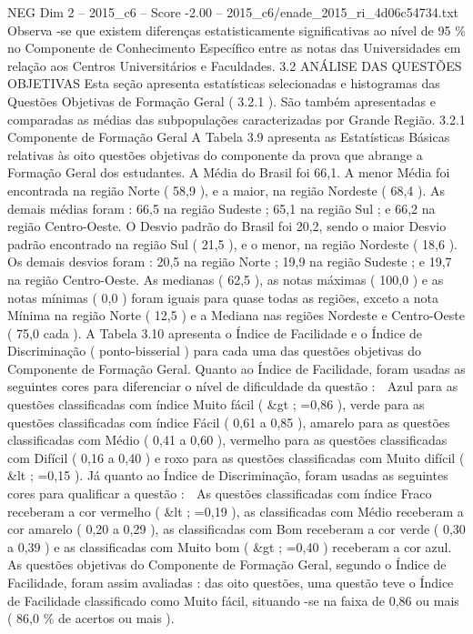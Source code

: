 \begin{textsample}{NEG Dim 2 – 2015\_c6 – Score -2.00 – 2015\_c6/enade\_2015\_ri\_4d06c54734.txt}
Observa -se que existem diferenças estatisticamente significativas ao nível de 95 \% no Componente de Conhecimento Específico entre as notas das Universidades em relação aos Centros Universitários e Faculdades. 3.2 ANÁLISE DAS QUESTÕES OBJETIVAS Esta seção apresenta estatísticas selecionadas e histogramas das Questões Objetivas de Formação Geral ( 3.2.1 ).
São também apresentadas e comparadas as médias das subpopulações caracterizadas por Grande Região. 3.2.1 Componente de Formação Geral A Tabela 3.9 apresenta as Estatísticas Básicas relativas às oito questões objetivas do componente da prova que abrange a Formação Geral dos estudantes.
A Média do Brasil foi 66,1.
A menor Média foi encontrada na região Norte ( 58,9 ), e a maior, na região Nordeste ( 68,4 ).
As demais médias foram : 66,5 na região Sudeste ; 65,1 na região Sul ; e 66,2 na região Centro-Oeste.
O Desvio padrão do Brasil foi 20,2, sendo o maior Desvio padrão encontrado na região Sul ( 21,5 ), e o menor, na região Nordeste ( 18,6 ).
Os demais desvios foram : 20,5 na região Norte ; 19,9 na região Sudeste ; e 19,7 na região Centro-Oeste.
As medianas ( 62,5 ), as notas máximas ( 100,0 ) e as notas mínimas ( 0,0 ) foram iguais para quase todas as regiões, exceto a nota Mínima na região Norte ( 12,5 ) e a Mediana nas regiões Nordeste e Centro-Oeste ( 75,0 cada ).
A Tabela 3.10 apresenta o Índice de Facilidade e o Índice de Discriminação ( ponto-bisserial ) para cada uma das questões objetivas do Componente de Formação Geral.
Quanto ao Índice de Facilidade, foram usadas as seguintes cores para diferenciar o nível de dificuldade da questão :  Azul para as questões classificadas com índice Muito fácil ( \&gt ; =0,86 ), verde para as questões classificadas com índice Fácil ( 0,61 a 0,85 ), amarelo para as questões classificadas com Médio ( 0,41 a 0,60 ), vermelho para as questões classificadas com Difícil ( 0,16 a 0,40 ) e roxo para as questões classificadas com Muito difícil ( \&lt ; =0,15 ).
Já quanto ao Índice de Discriminação, foram usadas as seguintes cores para qualificar a questão :  As questões classificadas com índice Fraco receberam a cor vermelho ( \&lt ; =0,19 ), as classificadas com Médio receberam a cor amarelo ( 0,20 a 0,29 ), as classificadas com Bom receberam a cor verde ( 0,30 a 0,39 ) e as classificadas com Muito bom ( \&gt ; =0,40 ) receberam a cor azul.
As questões objetivas do Componente de Formação Geral, segundo o Índice de Facilidade, foram assim avaliadas : das oito questões, uma questão teve o Índice de Facilidade classificado como Muito fácil, situando -se na faixa de 0,86 ou mais ( 86,0 \% de acertos ou mais ).

\end{textsample}
